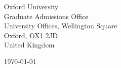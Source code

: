 \begin{minipage}{0.49\textwidth}
\begin{flushleft}
\noindent
Oxford University\\
Graduate Admissions Office \\
University Offices, Wellington Square\\
Oxford, OX1 2JD\\
United Kingdom 
\end{flushleft}
\end{minipage}
\begin{minipage}{0.47\textwidth}
\begin{flushright}
\today
\end{flushright}
\end{minipage} \\

\newcommand{\univ}{Oxford University}
\newcommand{\univshort}{Oxford}
\newcommand{\degree}{D.Phil.}
\newcommand{\dept}{Health Data Science}
